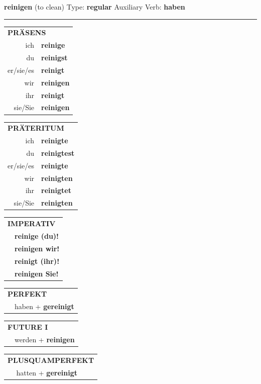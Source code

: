\documentclass[10pt,a4paper]{revtex4-2}
\begin{document}
\begin{verbbox}
{\Large \bf reinigen} (to clean) \hfill Type: \textbf{regular} \hfill Auxiliary Verb: \textbf{haben}

\vspace{5pt}
\hrule
\vspace{5pt}

\begin{tabular}{rl}
\multicolumn{2}{l}{\textbf{PRÄSENS}}\\
ich & \textbf{reinige}\\
du & \textbf{reinigst}\\
er/sie/es & \textbf{reinigt}\\
wir & \textbf{reinigen}\\
ihr & \textbf{reinigt}\\
sie/Sie & \textbf{reinigen}\\
\end{tabular}
\hfill
\begin{tabular}{rl}
\multicolumn{2}{l}{\textbf{PRÄTERITUM}}\\
ich & \textbf{reinigte}\\
du & \textbf{reinigtest}\\
er/sie/es & \textbf{reinigte}\\
wir & \textbf{reinigten}\\
ihr & \textbf{reinigtet}\\
sie/Sie & \textbf{reinigten}\\
\end{tabular}
\hfill
\begin{tabular}{rl}
\multicolumn{2}{l}{\textbf{IMPERATIV}}\\
& \textbf{reinige (du)!}\\
& \textbf{reinigen wir!}\\
& \textbf{reinigt (ihr)!}\\
& \textbf{reinigen Sie!}\\
\end{tabular}

\vspace{10pt}

\begin{tabular}{rl}
\multicolumn{2}{l}{\textbf{PERFEKT}}\\
& haben + \textbf{gereinigt}\\
\end{tabular}
\hfill
\begin{tabular}{rl}
\multicolumn{2}{l}{\textbf{FUTURE I}}\\
& werden + \textbf{reinigen}\\
\end{tabular}
\hfill
\begin{tabular}{rl}
\multicolumn{2}{l}{\textbf{PLUSQUAMPERFEKT}}\\
& hatten + \textbf{gereinigt}\\
\end{tabular}


\end{verbbox}
\end{document}
